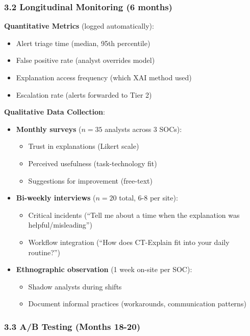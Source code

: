 \documentclass[11pt]{article}
\begin{document}
\subsubsection{3.2 Longitudinal Monitoring (6 months)}

\textbf{Quantitative Metrics} (logged automatically):
\begin{itemize}
    \item Alert triage time (median, 95th percentile)
    \item False positive rate (analyst overrides model)
    \item Explanation access frequency (which XAI method used)
    \item Escalation rate (alerts forwarded to Tier 2)
\end{itemize}

\textbf{Qualitative Data Collection}:
\begin{itemize}
    \item \textbf{Monthly surveys} ($n = 35$ analysts across 3 SOCs):
    \begin{itemize}
        \item Trust in explanations (Likert scale)
        \item Perceived usefulness (task-technology fit)
        \item Suggestions for improvement (free-text)
    \end{itemize}
    \item \textbf{Bi-weekly interviews} ($n = 20$ total, 6-8 per site):
    \begin{itemize}
        \item Critical incidents (``Tell me about a time when the explanation was helpful/misleading'')
        \item Workflow integration (``How does CT-Explain fit into your daily routine?'')
    \end{itemize}
    \item \textbf{Ethnographic observation} (1 week on-site per SOC):
    \begin{itemize}
        \item Shadow analysts during shifts
        \item Document informal practices (workarounds, communication patterns)
    \end{itemize}
\end{itemize}

\subsubsection{3.3 A/B Testing (Months 18-20)}
\end{document}
